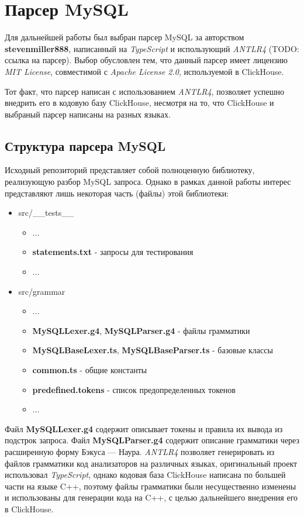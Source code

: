 \section{Парсер MySQL} \label{chap:mysql}
Для дальнейшей работы был выбран парсер MySQL за авторством \textbf{stevenmiller888}, написанный на \textit{TypeScript} и использующий \textit{ANTLR4} (TODO: ссылка на парсер). Выбор обусловлен тем, что данный парсер имеет лицензию \textit{MIT License}, совместимой с \textit{Apache License 2.0}, используемой в ClickHouse.

Тот факт, что парсер написан с использованием \textit{ANTLR4}, позволяет успешно внедрить его в кодовую базу ClickHouse, несмотря на то, что ClickHouse и выбраный парсер написаны на разных языках.

\subsection{Структура парсера MySQL}
Исходный репозиторий представляет собой полноценную библиотеку, реализующую разбор MySQL запроса. Однако в рамках данной работы интерес представляют лишь некоторая часть (файлы) этой библиотеки:
\begin{itemize}
    \item src/\_\_tests\_\_
    \begin{itemize}
        \item ...
        \item \textbf{statements.txt} - запросы для тестирования
        \item ...
    \end{itemize}
    \item src/grammar
    \begin{itemize}
        \item ...
        \item \textbf{MySQLLexer.g4}, \textbf{MySQLParser.g4} - файлы грамматики
        \item \textbf{MySQLBaseLexer.ts}, \textbf{MySQLBaseParser.ts} - базовые классы
        \item \textbf{common.ts} - общие константы
        \item \textbf{predefined.tokens} - список предопределенных токенов
        \item ...
    \end{itemize}
\end{itemize}

\pagebreak

Файл \textbf{MySQLLexer.g4} содержит описывает токены и правила их вывода из подстрок запроса. Файл \textbf{MySQLParser.g4} содержит описание грамматики через расширенную форму Бэкуса — Наура. \textit{ANTLR4} позволяет генерировать из файлов грамматики код анализаторов на различных языках, оригинальный проект использовал \textit{TypeScript}, однако кодовая база ClickHouse написана по большей части на языке C++, поэтому файлы грамматики были несущественно изменены и использованы для генерации кода на C++, с целью дальнейшего внедрения его в ClickHouse.

